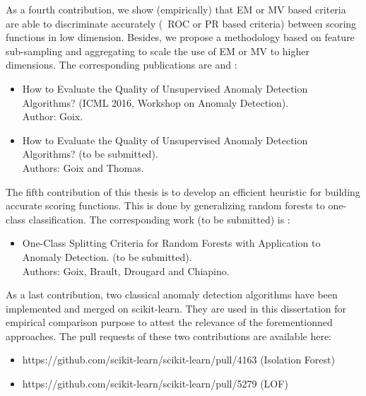 As a fourth contribution, we show (empirically) that EM or MV based criteria are able to discriminate accurately (\wrt~ROC or PR based criteria) between scoring functions in low dimension. Besides, we propose a methodology based on feature sub-sampling and aggregating to scale the use of EM or MV to higher dimensions.
The corresponding publications are \cite{ICMLworkshop16} and \cite{NIPS16evaluation}:
\begin{itemize}
\item How to Evaluate the Quality of Unsupervised Anomaly Detection Algorithms? (ICML 2016, Workshop on Anomaly Detection). %
  \\
Author: Goix. 
\item How to Evaluate the Quality of Unsupervised Anomaly Detection Algorithms? (to be submitted).\\ Authors: Goix and Thomas. 
\end{itemize}


The fifth contribution of this thesis is to develop an efficient heuristic for building accurate scoring functions. This is done by generalizing random forests to one-class classification. The corresponding work (to be submitted) is \cite{OCRF16}: 
\begin{itemize}
\item One-Class Splitting Criteria for Random Forests with Application to Anomaly Detection. (to be submitted).\\
Authors: Goix, Brault, Drougard and Chiapino.
\end{itemize}



As a last contribution, two classical anomaly detection algorithms have been implemented and merged on scikit-learn. They are used in this dissertation for empirical comparison purpose to attest the relevance of the forementionned approaches.
The pull requests of these two contributions are available here:
\begin{itemize}
\item https://github.com/scikit-learn/scikit-learn/pull/4163  (Isolation Forest)
\item https://github.com/scikit-learn/scikit-learn/pull/5279 (LOF)
\end{itemize}




